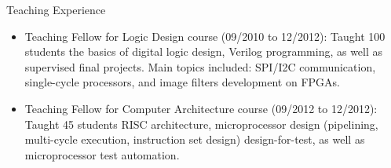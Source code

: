 \begin{rSection}{Teaching Experience}
	\begin{itemize}
		\item Teaching Fellow for Logic Design course (09/2010 to 12/2012): Taught 100 students the basics of digital logic design, Verilog programming, as well as supervised final projects. Main topics included: SPI/I2C communication, single-cycle processors, and image filters development on FPGAs.
		\item Teaching Fellow for Computer Architecture course (09/2012 to 12/2012): Taught 45 students RISC architecture, microprocessor design (pipelining, multi-cycle execution, instruction set design) design-for-test, as well as microprocessor test automation.
	\end{itemize}
\end{rSection}

